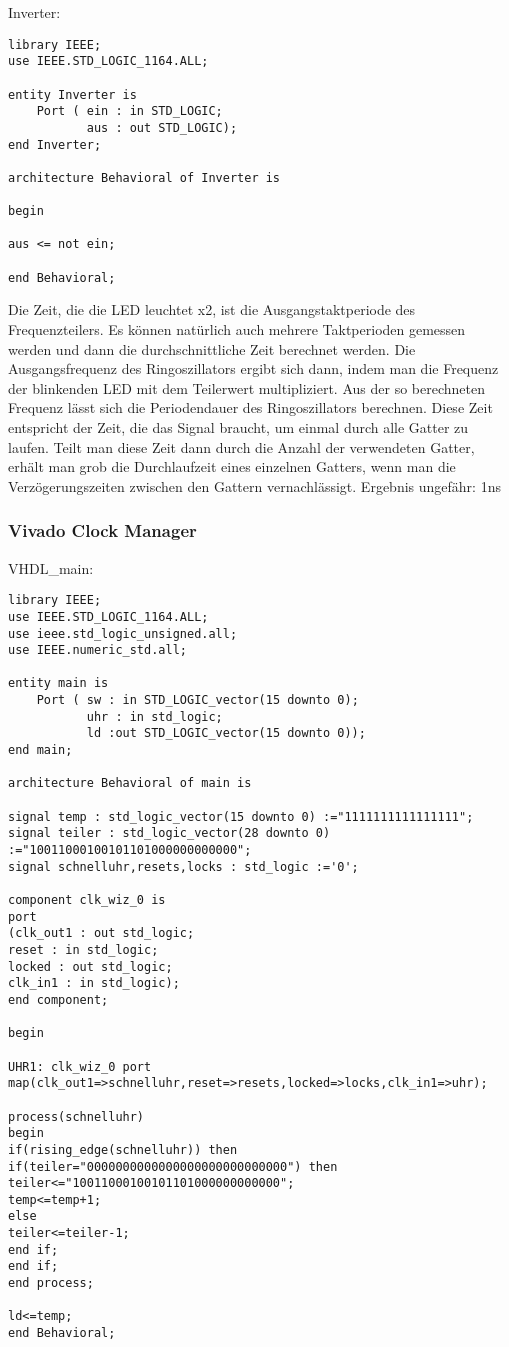 \documentclass{article}
\begin{document}
Inverter:\newline
\begin{verbatim}
library IEEE;
use IEEE.STD_LOGIC_1164.ALL;

entity Inverter is
    Port ( ein : in STD_LOGIC;
           aus : out STD_LOGIC);
end Inverter;

architecture Behavioral of Inverter is

begin

aus <= not ein;

end Behavioral;
\end{verbatim}
Die Zeit, die die LED leuchtet x2, ist die Ausgangstaktperiode des Frequenzteilers. Es k\"onnen nat\"urlich auch mehrere Taktperioden gemessen werden und dann die durchschnittliche Zeit berechnet werden. Die Ausgangsfrequenz des Ringoszillators ergibt sich dann, indem man die Frequenz der blinkenden LED mit dem Teilerwert multipliziert. Aus der so berechneten Frequenz l\"asst sich die Periodendauer des Ringoszillators berechnen. Diese Zeit entspricht der Zeit, die das Signal braucht, um einmal durch alle Gatter zu laufen. Teilt man diese Zeit dann durch die Anzahl der verwendeten Gatter, erh\"alt man grob die Durchlaufzeit eines einzelnen Gatters, wenn man die Verz\"ogerungszeiten zwischen den Gattern vernachl\"assigt.\newline
Ergebnis ungef\"ahr: 1ns

\subsubsection{Vivado Clock Manager}
VHDL\_main:\newline
\begin{verbatim}
library IEEE;
use IEEE.STD_LOGIC_1164.ALL;
use ieee.std_logic_unsigned.all;
use IEEE.numeric_std.all;

entity main is
    Port ( sw : in STD_LOGIC_vector(15 downto 0);
           uhr : in std_logic;
           ld :out STD_LOGIC_vector(15 downto 0));
end main;

architecture Behavioral of main is

signal temp : std_logic_vector(15 downto 0) :="1111111111111111";
signal teiler : std_logic_vector(28 downto 0) :="10011000100101101000000000000";
signal schnelluhr,resets,locks : std_logic :='0';

component clk_wiz_0 is
port
(clk_out1 : out std_logic;
reset : in std_logic;
locked : out std_logic;
clk_in1 : in std_logic);
end component;

begin

UHR1: clk_wiz_0 port map(clk_out1=>schnelluhr,reset=>resets,locked=>locks,clk_in1=>uhr);

process(schnelluhr)
begin
if(rising_edge(schnelluhr)) then
if(teiler="0000000000000000000000000000") then
teiler<="10011000100101101000000000000";
temp<=temp+1;
else
teiler<=teiler-1;
end if;
end if;
end process;

ld<=temp;
end Behavioral;
\end{verbatim}
\end{document}
